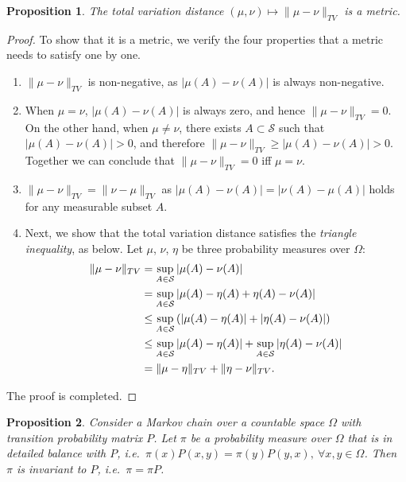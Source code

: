 \documentclass[a4paper,11pt]{article}
\newtheorem{proposition}{Proposition}
\newcommand{\sset}{\mathcal{S}}
\begin{document}
\begin{proposition}
    The total variation distance $(\mu, \nu) \mapsto \|\mu - \nu\|_{TV}$ is a metric.
\end{proposition}

\begin{proof}
    To show that it is a metric, we verify the four properties that a metric needs to satisfy one by one.
    \begin{enumerate}
        \item $\|\mu - \nu\|_{TV}$ is non-negative, as $|\mu(A) - \nu(A)|$ is always non-negative.
        \item When $\mu = \nu$, $|\mu(A) - \nu(A)|$ is always zero, and hence $\|\mu - \nu\|_{TV} = 0$. 
        On the other hand, when $\mu \ne \nu$, there exists $A \subset \sset$ such that $|\mu(A) - \nu(A)| > 0$, and therefore $\|\mu - \nu\|_{TV} \ge |\mu(A) - \nu(A)| > 0$.
        Together we can conclude that $\|\mu - \nu\|_{TV} = 0$ iff $\mu = \nu$.
        \item $\|\mu - \nu\|_{TV} = \|\nu - \mu\|_{TV}$ as $|\mu(A) - \nu(A)| = |\nu(A) - \mu(A)|$ holds for any measurable subset $A$.
        \item Next, we show that the total variation distance satisfies the \emph{triangle inequality}, as below. Let $\mu$, $\nu$, $\eta$ be three probability measures over $\Omega$:
        \begin{align}
            \|\mu - \nu\|_{TV} 
            &= \sup_{A \in \sset} |\mu(A) - \nu(A) | \notag \\
            &= \sup_{A \in \sset} |\mu(A) - \eta(A) + \eta(A) - \nu(A) | \notag \\
            &\le \sup_{A \in \sset} \left( |\mu(A) - \eta(A)| + |\eta(A) - \nu(A)| \right) \notag \\
            &\le \sup_{A \in \sset} |\mu(A) - \eta(A) | + \sup_{A \in \sset} |\eta(A) - \nu(A) | \notag \\
            &= \|\mu - \eta\|_{TV} + \|\eta - \nu\|_{TV}.
        \end{align}
    \end{enumerate}
    The proof is completed. 
\end{proof}


\begin{proposition}
    Consider a Markov chain over a countable space $\Omega$ with transition probability matrix $P$. Let $\pi$ be a probability measure over $\Omega$ that is in detailed balance with $P$, \textit{i.e.}~$\pi(x) P(x, y) = \pi(y) P(y, x), \ \forall x, y \in \Omega$. Then $\pi$ is invariant to $P$, \textit{i.e.}~$\pi = \pi P$.  
\end{proposition}
\end{document}
